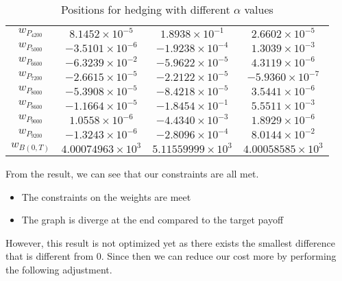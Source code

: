 \begin{table}[H]
\begin{tabular}{|c|c|c|c|}
        \(w_{P_{4200}}\) & $8.1452 \times 10^{-5}$  & $1.8938 \times 10^{-1}$  & $2.6602 \times 10^{-5}$ \\
        \(w_{P_{5000}}\) & $-3.5101 \times 10^{-6}$ & $-1.9238 \times 10^{-4}$ & $1.3039 \times 10^{-3}$ \\
        \(w_{P_{6600}}\) & $-6.3239 \times 10^{-2}$ & $-5.9622 \times 10^{-5}$ & $4.3119 \times 10^{-6}$ \\
        \(w_{P_{7200}}\) & $-2.6615 \times 10^{-5}$ & $-2.2122 \times 10^{-5}$ & $-5.9360 \times 10^{-7}$ \\
        \(w_{P_{8000}}\) & $-5.3908 \times 10^{-5}$ & $-8.4218 \times 10^{-5}$ & $3.5441 \times 10^{-6}$ \\
        \(w_{P_{8600}}\) & $-1.1664 \times 10^{-5}$ & $-1.8454 \times 10^{-1}$ & $5.5511 \times 10^{-3}$ \\
        \(w_{P_{9000}}\) & $1.0558 \times 10^{-6}$  & $-4.4340 \times 10^{-3}$ & $1.8929 \times 10^{-6}$ \\
        \(w_{P_{9200}}\) & $-1.3243 \times 10^{-6}$ & $-2.8096 \times 10^{-4}$ & $8.0144 \times 10^{-2}$ \\
        \(w_{B(0,T)}\) & $4.00074963 \times 10^{3}$   & $5.11559999 \times 10^{3}$   & $4.00058585 \times 10^{3}$ \\
        \hline
    \end{tabular}
    \caption{Positions for hedging with different $\alpha$ values}
    \label{tab:alpha_values}
\end{table}

From the result, we can see that our constraints are all met.
\begin{itemize}
    \item The constraints on the weights are meet
    \item The graph is diverge at the end compared to the target payoff
\end{itemize}
However, this result is not optimized yet as there exists the smallest difference that is different from 0. Since then we can reduce our cost more by performing the following adjustment.

